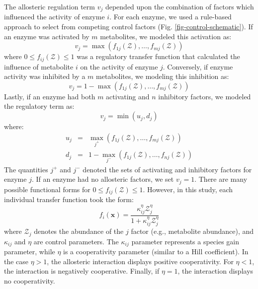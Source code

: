 \documentclass[processes,article,accept,moreauthors,pdftex,12pt,a4paper]{mdpi}
\begin{document}
The allosteric regulation term $v_{j}$ depended upon the combination of factors which influenced the activity of enzyme $i$.
For each enzyme, we used a rule-based approach to select from competing control factors (Fig. \ref{fig-control-schematic}). 
If an enzyme was activated by $m$ metabolites, we modeled this activation as:
\begin{equation}
	v_{j} = \max\left(f_{1j}\left(\mathcal{Z}\right),\hdots,f_{mj}\left(\mathcal{Z}\right)\right)
\end{equation}where $0\leq f_{ij}\left(\mathcal{Z}\right)\leq 1$ was a regulatory transfer function that calculated the influence of metabolite $i$ on the activity of enzyme $j$. 
Conversely, if enzyme activity was inhibited by a $m$ metabolites, we modeling this inhibition as:
\begin{equation}
	v_{j} = 1 - \max\left(f_{1j}\left(\mathcal{Z}\right),\hdots,f_{mj}\left(\mathcal{Z}\right)\right)
\end{equation}Lastly, if an enzyme had both $m$ activating and $n$ inhibitory factors, we modeled the regulatory term as:
\begin{equation}
	v_{j} = \min\left(u_{j},d_{j}\right)
\end{equation}where:
\begin{eqnarray}
	u_{j} &=& \max_{j^{+}}\left(f_{1j}\left(\mathcal{Z}\right),\hdots,f_{mj}\left(\mathcal{Z}\right)\right) \\
	d_{j} &=& 1 - \max_{j^{-}}\left(f_{1j}\left(\mathcal{Z}\right),\hdots,f_{nj}\left(\mathcal{Z}\right)\right)
\end{eqnarray}
The quantities $j^{+}$ and $j^{-}$ denoted the sets of activating and inhibitory factors for enzyme $j$. 
If an enzyme had no allosteric factors, we set $v_{j} = 1$.
There are many possible functional forms for $0\leq f_{ij}\left(\mathcal{Z}\right)\leq 1$. 
However, in this study, each individual transfer function took the form:
\begin{equation}\label{eqn:control-factor}
	f_{i}\left(\mathbf{x}\right) = \frac{\kappa_{ij}^{\eta}\mathcal{Z}_{j}^{\eta}}{1 + \kappa_{ij}^{\eta}\mathcal{Z}_{j}^{\eta}}
\end{equation}where $\mathcal{Z}_{j}$ denotes the abundance of the $j$ factor (e.g., metabolite abundance), and $\kappa_{ij}$ and $\eta$ are control parameters. 
The $\kappa_{ij}$ parameter represents a species gain parameter, while $\eta$ is a cooperativity parameter (similar to a Hill coefficient). 
In the case $\eta>1$, the allosteric interaction displays positive cooperativity. For $\eta<1$, the interaction is negatively cooperative. Finally, if $\eta=1$, the interaction displays no cooperativity. 
\end{document}

